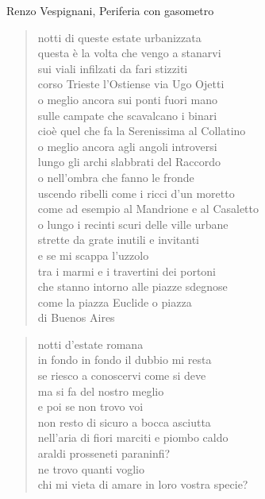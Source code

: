 \begin{artItem}
	Renzo Vespignani, Periferia con gasometro
\end{artItem}

	\begin{verse}
		notti di queste estate urbanizzata\\
		questa è la volta che vengo a stanarvi\\
		sui viali infilzati da fari stizziti\\
		corso Trieste l'Ostiense via Ugo Ojetti\\
		o meglio ancora sui ponti fuori mano\\
		sulle campate che scavalcano i binari\\
		cioè quel che fa la Serenissima al Collatino\\
		o meglio ancora agli angoli introversi\\
		lungo gli archi slabbrati del Raccordo\\
		o nell'ombra che fanno le fronde\\
		uscendo ribelli come i ricci d'un moretto\\
		come ad esempio al Mandrione e al Casaletto\\
		o lungo i recinti scuri delle ville urbane\\
		strette da grate inutili e invitanti\\
		e se mi scappa l'uzzolo\\
		tra i marmi e i travertini dei portoni\\
		che stanno intorno alle piazze sdegnose\\
		come la piazza Euclide o piazza\\
		di Buenos Aires
	\end{verse}

	\begin{verse}
		notti d'estate romana\\
		in fondo in fondo il dubbio mi resta\\
		se riesco a conoscervi come si deve\\
		ma si fa del nostro meglio\\
		e poi se non trovo voi\\
		non resto di sicuro a bocca asciutta\\
		nell'aria di fiori marciti e piombo caldo\\
		araldi prosseneti paraninfi?\\
		ne trovo quanti voglio\\
		chi mi vieta di amare in loro vostra specie?
	\end{verse}


